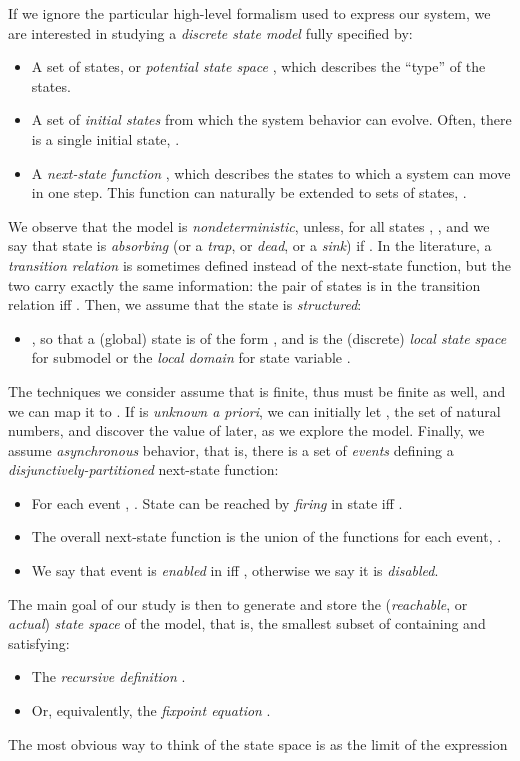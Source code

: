 \documentclass[copyright,creativecommons]{eptcs}
\begin{document}
If we ignore the particular high-level formalism used to express our system,
we are interested in studying a \emph{discrete state model} fully specified by:
\begin{itemize}
\item A set of states, or \emph{potential state space} ,
      which describes the ``type'' of the states.
\item A set of \emph{initial states} 
      from which the system behavior can evolve.
      Often, there is a single initial state, .
\item A \emph{next-state function} ,
      which describes the states to which a system can move in one step.
      This function can naturally be extended to sets of states,
      .
\end{itemize}
We observe that the model is \emph{nondeterministic},
unless, for all states , , and we say
that state  is \emph{absorbing} (or a \emph{trap}, or \emph{dead},
or a \emph{sink}) if .
In the literature, a \emph{transition relation} is sometimes defined
instead of the next-state function, but the two carry exactly
the same information: the pair of states
 is in the transition relation iff .
Then, we assume that the state is \emph{structured}:
\begin{itemize}
\item \times, so that
      a (global) state is of the form , and
       is the (discrete) \emph{local state space} for
      submodel  or the \emph{local domain} for state variable .
\end{itemize}
The techniques we consider assume that  is finite, thus 
must be finite as well, and we can map it to .
If  is \emph{unknown a priori}, we can initially
let , the set of natural numbers,
and discover the value of  later, as we explore the model.
Finally, we assume \emph{asynchronous} behavior, that is,
there is a set  of \emph{events} defining a
\emph{disjunctively-partitioned} next-state function:
\begin{itemize}
\item For each event ,
      .
      State  can be reached by \emph{firing}  in state 
      iff .
\item The overall next-state function is the union of the
      functions for each event,
      .
\item
We say that event  is \emph{enabled} in  iff
, otherwise we say it is \emph{disabled}.
\end{itemize}

The main goal of our study is then to generate and store the (\emph{reachable},
or \emph{actual}) \emph{state space}  of the model,
that is, the smallest subset of  containing 
and satisfying:
\begin{itemize}
\item The \emph{recursive definition}
      .
\item Or, equivalently, the \emph{fixpoint equation}
      .
\end{itemize}
The most obvious way to think of the state space is as the limit of the
expression
\end{document}
